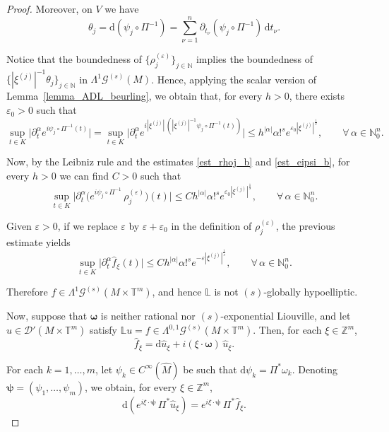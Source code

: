 \documentclass[11pt,reqno]{amsart}
\numberwithin{equation}{section}
\begin{document}
\begin{proof}
		Moreover, on \(V\) we have
		\[
		\theta_j = \mathrm{d}(\psi_j\circ\Pi^{-1})
		= \sum_{\nu=1}^{n}\partial_{t_\nu}(\psi_j\circ\Pi^{-1})\,\mathrm{d}t_\nu.
		\]
		
		Notice that the boundedness of \(\{\rho_j^{(\varepsilon)}\}_{j\in\mathbb{N}}\) implies the boundedness of \(\{|\xi^{(j)}|^{-1}\theta_j\}_{j\in\mathbb{N}}\) in \(\mathsf{\Lambda}^1\mathscr{G}^{(s)}(M)\).
		Hence, applying the scalar version of Lemma~\ref{lemma_ADL_beurling}, we obtain that, for every \(h>0\), there exists \(\varepsilon_0>0\) such that
		\begin{equation}\label{est_eipsi_b}
			\sup_{t\in K}\bigl|\partial_t^\alpha e^{i\psi_j\circ\Pi^{-1}(t)}\bigr|
			=
			\sup_{t\in K}\bigl|\partial_t^\alpha e^{i|\xi^{(j)}|\,(|\xi^{(j)}|^{-1}\psi_j\circ\Pi^{-1}(t))}\bigr|
			\leq h^{|\alpha|}\alpha!^s e^{\varepsilon_0|\xi^{(j)}|^{\frac{1}{s}}},
			\qquad \forall\, \alpha\in\mathbb{N}_0^n.
		\end{equation}
		
		Now, by the Leibniz rule and the estimates \eqref{est_rhoj_b} and \eqref{est_eipsi_b}, for every \(h>0\) we can find \(C>0\) such that
		\[
		\sup_{t\in K}\bigl|\partial_t^\alpha\bigl(e^{i\psi_j\circ\Pi^{-1}}\,\rho_j^{(\varepsilon)}\bigr)(t)\bigr|
		\leq
		Ch^{|\alpha|}\alpha!^s e^{\varepsilon_0|\xi^{(j)}|^{\frac{1}{s}}},
		\qquad \forall\, \alpha\in\mathbb{N}_0^n.
		\]
		
		Given \(\varepsilon>0\), if we replace \(\varepsilon\) by \(\varepsilon+\varepsilon_0\) in the definition of \(\rho_j^{(\varepsilon)}\), the previous estimate yields
		\[
		\sup_{t\in K}\bigl|\partial_t^{\alpha}\widehat{f}_\xi(t)\bigr|
		\leq
		Ch^{|\alpha|}\alpha!^s e^{-\varepsilon|\xi^{(j)}|^{\frac{1}{s}}},
		\qquad \forall\, \alpha\in\mathbb{N}_0^n.
		\]
		
		Therefore \(f\in\mathsf{\Lambda}^1\mathscr{G}^{(s)}(M\times\mathbb{T}^m)\), and hence \(\mathbb{L}\) is not \((s)\)-globally hypoelliptic.
		
		Now, suppose that \(\boldsymbol{\omega}\) is neither rational nor \((s)\)-exponential Liouville, and let
		\(u\in\mathscr{D}'(M\times\mathbb{T}^m)\) satisfy
		\(\mathbb{L}u=f\in\mathsf{\Lambda}^{0,1}\mathscr{G}^{(s)}(M\times\mathbb{T}^m)\).
		Then, for each \(\xi\in\mathbb{Z}^m\),
		\[
		\widehat{f}_\xi = \mathrm{d}\widehat{u}_\xi+i(\xi\cdot\boldsymbol{\omega})\,\widehat{u}_\xi.
		\]
		
		For each \(k=1,\dots,m\), let \(\psi_k\in C^\infty(\hat M)\) be such that \(\mathrm{d}\psi_k = \Pi^*\omega_k\).
		Denoting \(\boldsymbol{\psi}=(\psi_1,\dots,\psi_m)\), we obtain, for every \(\xi\in\mathbb{Z}^m\),
		\begin{equation}\label{deuef_psi_b}
			\mathrm{d}\!\left(e^{i\xi\cdot\boldsymbol{\psi}}\,\Pi^*\widehat{u}_\xi\right)
			=
			e^{i\xi\cdot\boldsymbol{\psi}}\,\Pi^*\widehat{f}_\xi.
		\end{equation}
		

\end{proof}
\end{document}
